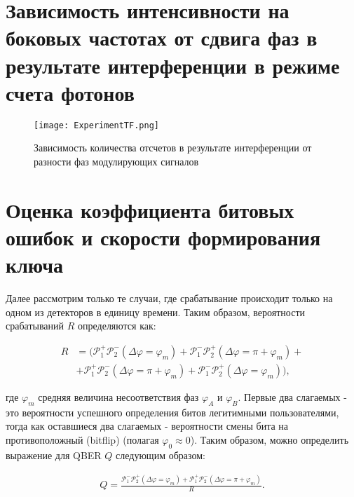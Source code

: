 \pagebreak

\section{Зависимость интенсивности на боковых частотах от сдвига фаз в результате интерференции в режиме счета фотонов} \label{ch:ch5/sec7}



 \begin{figure}[ht]
  \centering
  \texttt{[image: ExperimentTF.png]}
  \caption{Зависимость количества отсчетов в результате интерференции от разности фаз модулирующих сигналов}
  \label{fig:Experimental_TF}
\end{figure}


\pagebreak

\section{Оценка коэффициента битовых ошибок и скорости формирования ключа} \label{ch:ch5/sect8}

Далее рассмотрим только те случаи, где срабатывание происходит только на одном из детекторов в единицу времени.  Таким образом, вероятности срабатываний $R$ определяются как:

\begin{align}
    R&=\Big(\mathcal{P}_{1}^{+}\mathcal{P}_{2}^{-}(\Delta\varphi=\varphi_m)+\mathcal{P}_{1}^{-}\mathcal{P}_{2}^{+}(\Delta\varphi=\pi+\varphi_m)+ \nonumber \\
    &+\mathcal{P}_{1}^{+}\mathcal{P}_{2}^{-}(\Delta\varphi=\pi+\varphi_m)+\mathcal{P}_{1}^{-}\mathcal{P}_{2}^{+}(\Delta\varphi=\varphi_m)\Big),
\end{align}


где $\varphi_m$ средняя величина несоответствия фаз $\varphi_A$ и $\varphi_B$. Первые два слагаемых - это вероятности успешного определения битов легитимными пользователями, тогда как оставшиеся два слагаемых - вероятности смены бита на противоположный (bitflip) (полагая $\varphi_0 \approx 0$). Таким образом, можно определить выражение для QBER $Q$ следующим образом:

\begin{align}
    Q=\frac{\mathcal{P}_{1}^{-}\mathcal{P}_{2}^{+}(\Delta\varphi=\varphi_m)+\mathcal{P}_{1}^{+}\mathcal{P}_{2}^{-}(\Delta\varphi=\pi+\varphi_m)}{R}.
\end{align}


